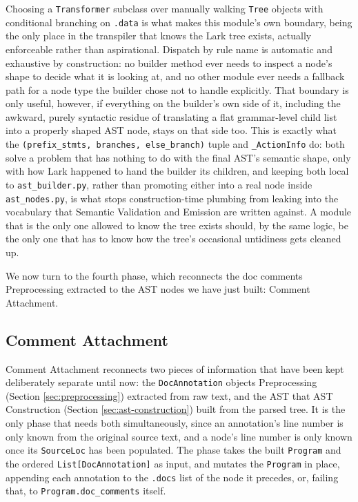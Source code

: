 Choosing a \lstinline|Transformer| subclass over manually walking \lstinline|Tree| objects with conditional branching on \lstinline|.data| is what makes this module's own boundary, being the only place in the transpiler that knows the Lark tree exists, actually enforceable rather than aspirational. Dispatch by rule name is automatic and exhaustive by construction: no builder method ever needs to inspect a node's shape to decide what it is looking at, and no other module ever needs a fallback path for a node type the builder chose not to handle explicitly. That boundary is only useful, however, if everything on the builder's own side of it, including the awkward, purely syntactic residue of translating a flat grammar-level child list into a properly shaped AST node, stays on that side too. This is exactly what the \lstinline|(prefix_stmts, branches, else_branch)| tuple and \lstinline|_ActionInfo| do: both solve a problem that has nothing to do with the final AST's semantic shape, only with how Lark happened to hand the builder its children, and keeping both local to \lstinline|ast_builder.py|, rather than promoting either into a real node inside \lstinline|ast_nodes.py|, is what stops construction-time plumbing from leaking into the vocabulary that Semantic Validation and Emission are written against. A module that is the only one allowed to know the tree exists should, by the same logic, be the only one that has to know how the tree's occasional untidiness gets cleaned up.

We now turn to the fourth phase, which reconnects the doc comments Preprocessing extracted to the AST nodes we have just built: Comment Attachment.

\subsection{Comment Attachment}
\label{sec:comment-attachment}
Comment Attachment reconnects two pieces of information that have been kept deliberately separate until now: the \lstinline|DocAnnotation| objects Preprocessing (Section \ref{sec:preprocessing}) extracted from raw text, and the AST that AST Construction (Section \ref{sec:ast-construction}) built from the parsed tree. It is the only phase that needs both simultaneously, since an annotation's line number is only known from the original source text, and a node's line number is only known once its \lstinline|SourceLoc| has been populated. The phase takes the built \lstinline|Program| and the ordered \lstinline|List[DocAnnotation]| as input, and mutates the \lstinline|Program| in place, appending each annotation to the \lstinline|.docs| list of the node it precedes, or, failing that, to \lstinline|Program.doc_comments| itself.

